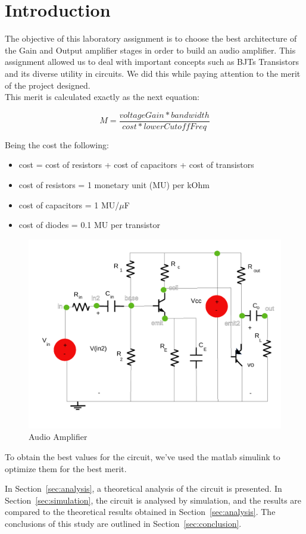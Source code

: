 \newpage
\section{Introduction}
\label{sec:introduction}

The objective of this laboratory assignment is to choose the best architecture of the Gain and Output amplifier
stages in order to build an audio amplifier. This assignment allowed us to deal with important concepts such as BJTs Transistors and its diverse utility in circuits. We did this while paying attention to the merit of the project designed.\\
This merit is calculated exactly as the next equation:

\begin{equation} 
M = \frac{voltageGain*bandwidth}{cost*lowerCutoffFreq}
\label{eq1}
\end{equation}

Being the cost the following:
\begin{itemize}
	\item cost = cost of resistors  + cost of capacitors + cost of transistors
	\item cost of resistors = 1 monetary unit (MU) per kOhm
	\item cost of capacitors = 1 MU/$\mu$F
	\item cost of diodes = 0.1 MU per transistor
	
\end{itemize}

\begin{figure}[H] 
\centering
\includegraphics[width=\textwidth]{lab4.pdf} 
\caption{Audio Amplifier}
\label{first}
\end{figure}

To obtain the best values for the circuit, we've used the matlab simulink to optimize them for the best merit.

In Section~\ref{sec:analysis}, a theoretical analysis of the circuit is
presented. In Section~\ref{sec:simulation}, the circuit is analysed by
simulation, and the results are compared to the theoretical results obtained in
Section~\ref{sec:analysis}. The conclusions of this study are outlined in
Section~\ref{sec:conclusion}. \\


